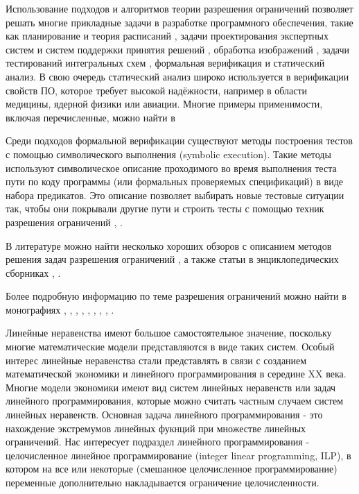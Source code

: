 \documentclass[a4paper,14pt,russian]{extreport}
\begin{document}
\par Использование подходов и алгоритмов теории разрешения ограничений позволяет решать многие прикладные задачи в разработке программного обеспечения, такие как планирование \cite{kautz} и теория расписаний \cite{barnier}, задачи проектирования экспертных систем и систем поддержки принятия решений \cite{saraev}, обработка изображений \cite{montanari}, задачи тестирований интегральных схем \cite{hooker}, формальная верификация и статический анализ. В свою очередь статический анализ широко используется в верификации свойств ПО, которое требует высокой надёжности, например в области медицины, ядерной физики или авиации. Многие примеры применимости, включая перечисленные, можно найти в \cite{heipcke}
\par Среди подходов формальной верификации существуют методы построения тестов с помощью символического выполнения (symbolic execution). Такие методы используют символическое описание проходимого во время выполнения теста пути по коду программы (или формальных проверяемых спецификаций) в виде набора предикатов. Это описание позволяет выбирать новые тестовые ситуации так, чтобы они покрывали другие пути и строить тесты с помощью техник разрешения ограничений \cite{gotlieb}, \cite{boyapati}. 
\par В литературе можно найти несколько хороших обзоров с описанием методов решения задач разрешения ограничений \cite{kumar} \cite{dechter_frost} \cite{bartak} \cite{meseguer} \cite{miguel}, а также статьи в энциклопедических сборниках  \cite{dechter_networks}, \cite{hower} \cite{mackworth}.
\par Более подробную информацию по теме разрешения ограничений можно найти в монографиях \cite{apt}, \cite{dechter}, \cite{fruehwirth}, \cite{marriott}, \cite{rossi}, \cite{hentenryck}, \cite{hentenryck_michel_deville}, \cite{hentenryck_opl}, \cite{hentenryck_michel}. 
\par Линейные неравенства имеют большое самостоятельное значение, поскольку многие математические модели представляются в виде таких систем. Особый интерес линейные неравенства стали представлять в связи с созданием математической экономики \cite{kantorovich} и линейного программирования в середине XX века. Многие модели экономики имеют вид систем линейных неравенств или задач линейного программирования, которые можно считать частным случаем систем линейных неравенств. Основная задача линейного программирования - это нахождение экстремумов линейных фукнций при множестве линейных ограничений. Нас интересует подраздел линейного программирования - целочисленное линейное программирование (integer linear programming, ILP), в котором на все или некоторые (смешанное целочисленное программирование) переменные дополнительно накладывается ограничение целочисленности. 
\end{document}
